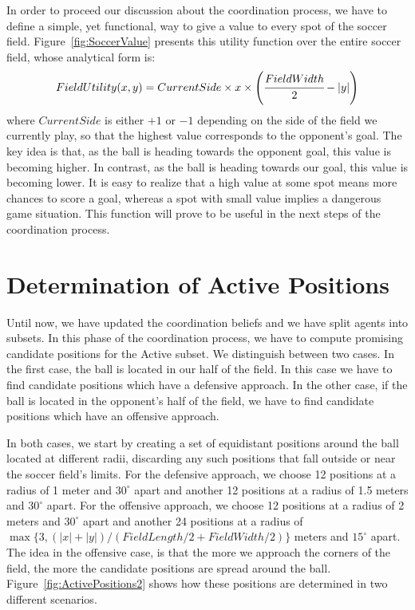 In order to proceed our discussion about the coordination process, we have to define a simple, yet functional, way to give a value to every spot of the soccer field. Figure~\ref{fig:SoccerValue} presents this utility function over the entire soccer field, whose analytical form is: 
\[
FieldUtility(x,y) = CurrentSide \times x \times \left(\cfrac{FieldWidth}{2} - |y|\right) 
\]
where $CurrentSide$ is either $+1$ or $-1$ depending on the side of the field we currently play, so that the highest value corresponds to the opponent's goal. 
The key idea is that, as the ball is heading towards the opponent goal, this value is becoming higher. In contrast, as the ball is heading towards our goal, this value is becoming lower. It is easy to realize that a high value at some spot means more chances to score a goal, whereas a spot with small value implies a dangerous game situation. This function will prove to be useful in the next steps of the coordination process.




\section{Determination of Active Positions}
Until now, we have updated the coordination beliefs and we have split agents into subsets. In this phase of the coordination process, we have to compute promising candidate positions for the Active subset. We distinguish between two cases. In the first case, the ball is located in our half of the field. In this case we have to find candidate positions which have a defensive approach. In the other case, if the ball is located in the opponent's half of the field, we have to find candidate positions which have an offensive approach. 

In both cases, we start by creating a set of equidistant positions around the ball located at different radii, discarding any such positions that fall outside or near the soccer field's limits. For the defensive approach, we choose 12 positions at a radius of 1 meter and $30^\circ$ apart and another 12 positions at a radius of 1.5 meters and $30^\circ$ apart. For the offensive approach, we choose 12 positions at a radius of 2 meters and $30^\circ$ apart and another 24 positions at a radius of $\max\{3,(|x|+|y|)/(FieldLength/2+FieldWidth/2)\}$ meters and $15^\circ$ apart. The idea in the offensive case, is that the more we approach the corners of the field, the more the candidate positions are spread around the ball. Figure~\ref{fig:ActivePositions2} shows how these positions are determined in two different scenarios. 

